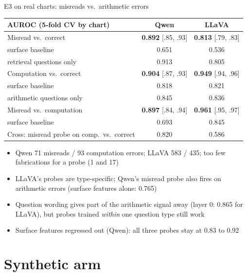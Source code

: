 \documentclass[10pt,aspectratio=169]{beamer}
\newcommand{\hl}[1]{\alert{\textbf{#1}}}
\begin{document}
\begin{frame}{E3 on real charts: misreads vs.\ arithmetic errors}
\centering\scriptsize
\begin{tabular}{lcc}
\toprule
AUROC (5-fold CV by chart) & Qwen & LLaVA \\
\midrule
Misread vs.\ correct & \hl{0.892} {\scriptsize[.85, .93]} & \hl{0.813} {\scriptsize[.79, .83]} \\
\quad surface baseline & 0.651 & 0.536 \\
\quad retrieval questions only & 0.913 & 0.805 \\
Computation vs.\ correct & \hl{0.904} {\scriptsize[.87, .93]} & \hl{0.949} {\scriptsize[.94, .96]} \\
\quad surface baseline & 0.818 & 0.821 \\
\quad arithmetic questions only & 0.845 & 0.836 \\
Misread vs.\ computation & \hl{0.897} {\scriptsize[.84, .94]} & \hl{0.961} {\scriptsize[.95, .97]} \\
\quad surface baseline & 0.693 & 0.845 \\
\midrule
Cross: misread probe on comp.\ vs.\ correct & 0.820 & 0.586 \\
\bottomrule
\end{tabular}
\vspace{0.2em}
\raggedright
\begin{itemize}\scriptsize
\item Qwen 71 misreads / 93 computation errors; LLaVA 583 / 435; too few
fabrications for a probe (1 and 17)
\item LLaVA's probes are type-specific; Qwen's misread probe also fires on
arithmetic errors (surface features alone: 0.765)
\item Question wording gives part of the arithmetic signal away (layer 0: 0.865
for LLaVA), but probes trained \emph{within} one question type still work
\item Surface features regressed out (Qwen): all three probes stay at 0.83 to 0.92
\end{itemize}
\end{frame}

\section{Synthetic arm}
\end{document}
